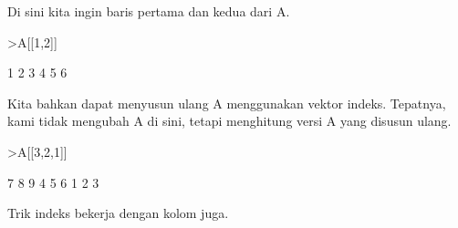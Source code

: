 \documentclass{article}
\begin{document}
\begin{eulernotebook}
\begin{eulercomment}
\begin{eulercomment}
\begin{eulercomment}
\begin{eulercomment}
\begin{eulercomment}
Di sini kita ingin baris pertama dan kedua dari A.
\end{eulercomment}
\begin{eulerprompt}
>A[[1,2]]
\end{eulerprompt}
\begin{euleroutput}
              1             2             3 
              4             5             6 
\end{euleroutput}
\begin{eulercomment}
Kita bahkan dapat menyusun ulang A menggunakan vektor indeks.
Tepatnya, kami tidak mengubah A di sini, tetapi menghitung versi A
yang disusun ulang.
\end{eulercomment}
\begin{eulerprompt}
>A[[3,2,1]]
\end{eulerprompt}
\begin{euleroutput}
              7             8             9 
              4             5             6 
              1             2             3 
\end{euleroutput}
\begin{eulercomment}
Trik indeks bekerja dengan kolom juga.


\end{eulercomment}
\end{eulercomment}
\end{eulercomment}
\end{eulercomment}
\end{eulercomment}
\end{eulernotebook}
\end{document}
